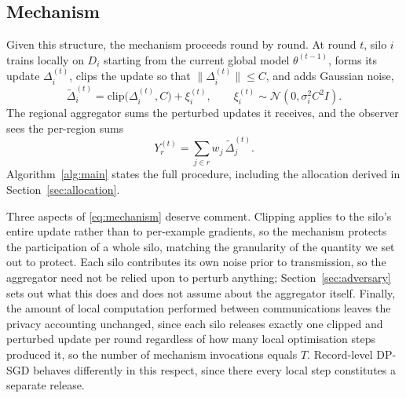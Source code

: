 \documentclass[acmsmall,screen,review,anonymous]{acmart}
\theoremstyle{acmdefinition}%
\begin{document}
\subsection{Mechanism}

Given this structure, the mechanism proceeds round by round. At round $t$, silo $i$
trains locally on $D_i$ starting from the current global model $\theta^{(t-1)}$,
forms its update $\Delta_i^{(t)}$, clips the update so that $\|\Delta_i^{(t)}\| \le
C$, and adds Gaussian noise,
\begin{equation}
\tilde{\Delta}_i^{(t)} = \mathrm{clip}\big(\Delta_i^{(t)}, C\big) + \xi_i^{(t)},
\qquad
\xi_i^{(t)} \sim \mathcal{N}\!\left(0, \sigma_i^2 C^2 I\right).
\label{eq:mechanism}
\end{equation}
The regional aggregator sums the perturbed updates it receives, and the observer
sees the per-region sums
\begin{equation}
Y_r^{(t)} = \sum_{j \in r} w_j \, \tilde{\Delta}_j^{(t)} .
\label{eq:observation}
\end{equation}
Algorithm~\ref{alg:main} states the full procedure, including the allocation
derived in Section~\ref{sec:allocation}.

Three aspects of \eqref{eq:mechanism} deserve comment. Clipping applies to the
silo's entire update rather than to per-example gradients, so the mechanism
protects the participation of a whole silo, matching the granularity of the
quantity we set out to protect. Each silo contributes its own noise prior to
transmission, so the aggregator need not be relied upon to perturb anything;
Section~\ref{sec:adversary} sets out what this does and does not assume about the
aggregator itself. Finally, the amount of local computation performed between
communications leaves the privacy accounting unchanged, since each silo releases
exactly one clipped and perturbed update per round regardless of how many local
optimisation steps produced it, so the number of mechanism invocations equals $T$.
Record-level DP-SGD behaves differently in this respect, since there every local
step constitutes a separate release.
\end{document}
